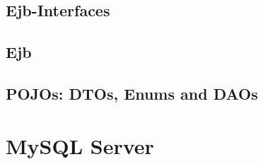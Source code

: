 \subsection{Ejb-Interfaces}


\subsection{Ejb}


\subsection{POJOs: DTOs, Enums and DAOs}
\label{subsec:pojos}


\section{MySQL Server}


